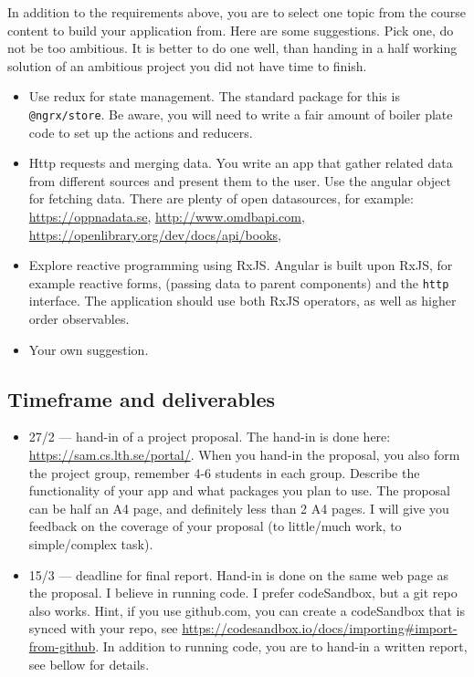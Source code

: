 \documentclass[fleqn, article, a4paper]{memoir}
\begin{document}
\noindent In addition to the requirements above, you are to select one topic from the course content to build your application from. Here are some suggestions. Pick one, do not be too ambitious. It is better to do one well, than handing in a half working solution of an ambitious project you did not have time to finish.
\begin{itemize}
\item Use redux for state management. The standard package for this is \texttt{@ngrx/store}. Be aware, you will need to write a fair amount of boiler plate code to set up the actions and reducers.
\item Http requests and merging data. You write an app that gather related data from different sources and present them to the user. Use the angular  object for fetching data. There are plenty of open datasources, for example: \url{https://oppnadata.se}, \url{http://www.omdbapi.com}, \url{https://openlibrary.org/dev/docs/api/books}, 
\item Explore reactive programming using RxJS. Angular is built upon RxJS, for example reactive forms,  (passing data to parent components) and the \texttt{http} interface. The application should use both RxJS operators, as well as higher order observables.
\item Your own suggestion. 
\end{itemize}

\subsection*{Timeframe and deliverables}

\begin{itemize}
\item 27/2 --- hand-in of a project proposal. The hand-in is done here: \url{https://sam.cs.lth.se/portal/}. When you hand-in the proposal, you also form the project group, remember 4-6 students in each group. Describe the functionality of your app and what packages you plan to use. The proposal can be half an A4 page, and definitely less than 2 A4 pages. I will give you feedback on the coverage of your proposal (to little/much work, to simple/complex task).
\item 15/3 --- deadline for final report. Hand-in is done on the same web page as the proposal. I believe in running code. I prefer codeSandbox, but a git repo also works. Hint, if you use github.com, you can create a codeSandbox that is synced with your repo, see \url{https://codesandbox.io/docs/importing#import-from-github}. In addition to running code, you are to hand-in a written report, see bellow for details.
\end{itemize}
\end{document}
